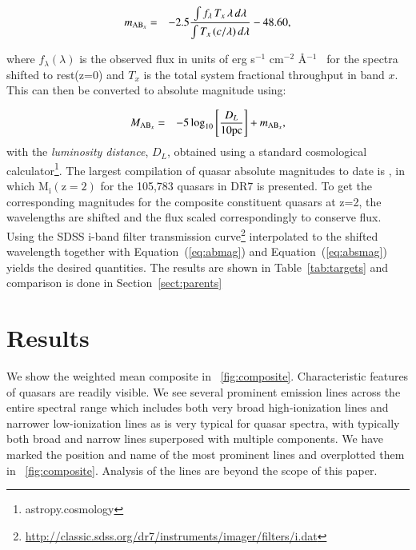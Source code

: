 \documentclass{aa}    %
\newcommand{\figref}[1]{\ref{fig:#1}}
\newcommand{\Fig}[1]{\figurename~\figref{#1}}
\newcommand{\fig}[1]{\Fig{#1}}
\newcommand{\Tab}[1]{Table~\ref{tab:#1}}
\newcommand{\tab}[1]{\Tab{#1}}
\newcommand{\Eq}[1]{Equation~(\ref{eq:#1})}
\newcommand{\eq}[1]{\Eq{#1}}
\newcommand{\eqlabel}[1]{\label{eq:#1}}
\newcommand{\sectionname}{Section}
\newcommand{\Sect}[1]{\sectionname~\ref{sect:#1}}
\newcommand{\sect}[1]{\Sect{#1}}
\newcommand{\sectlabel}[1]{\label{sect:#1}}
\newcommand{\fluxunit}{erg s$^{-1}$ cm$^{-2}$ \AA$^{-1}$}
\begin{document}
\begin{eqnarray}\eqlabel{abmag}
m_{\textmd{AB}_x} &=& -2.5  \frac{\int f_\lambda \,  T_{x}  \, \lambda \,  d\lambda} 
{\int  T_{x} \,  (c / \lambda) \,  d\lambda}  - 48.60,
\end{eqnarray}
 
 
where $f_\lambda (\lambda)$ is the observed flux in units of \fluxunit~ for the spectra shifted to rest(z=0) and $T_{x} $ is the total system fractional throughput in band $x$. This can then be converted to absolute magnitude using:

\begin{eqnarray}\eqlabel{absmag}
M_{\textmd{AB}_x} &=& -5 \log_{10} \left[  \frac{D_L }{10 \mathrm{pc}}   \right] + m_{\textmd{AB}_x} ,
\end{eqnarray}
with the \textit{luminosity distance}, $D_L$,  obtained using a standard cosmological calculator\footnote{astropy.cosmology}.
 The largest compilation of quasar absolute magnitudes to date is \cite{Shen2011}, in which $\mathrm{M_i (z=2)}$ for the 105,783 quasars in DR7 is presented. To get the corresponding magnitudes for the composite constituent quasars at z=2, the wavelengths are shifted and the flux scaled correspondingly to conserve flux. Using the SDSS i-band filter transmission curve\footnote{\url{http://classic.sdss.org/dr7/instruments/imager/filters/i.dat}} interpolated to the shifted wavelength together with \eq{abmag} and \eq{absmag} yields the desired quantities. The results are shown in \tab{targets} and comparison is done in \sect{parents}







\section{Results}   \sectlabel{results}


We show the weighted mean composite in \fig{composite}. Characteristic features of quasars are readily visible. We see several prominent emission lines across the entire spectral range which includes both very broad high-ionization lines and narrower low-ionization lines as is very typical for quasar spectra, with typically both broad and narrow lines superposed with multiple components. We have marked the position and name of the most prominent lines and overplotted them in \fig{composite}.  Analysis of the lines are beyond the scope of this paper.
\end{document}
